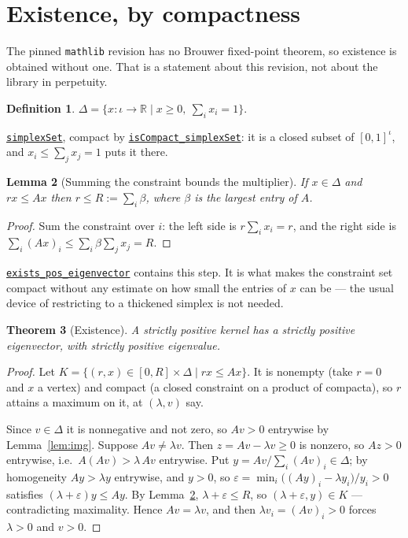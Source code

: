 \documentclass[11pt]{article}
\newtheorem{theorem}{Theorem}[section]
\newtheorem{lemma}[theorem]{Lemma}
\theoremstyle{definition}
\newtheorem{definition}[theorem]{Definition}
\newcommand{\anchor}{08a9050201287a31d20fc4339cc5c6c64b1391fb}
\newcommand{\osline}[3]{%
  \href{https://github.com/lluiseriksson/THE-ERIKSSON-PROGRAMME/blob/\anchor/YangMills/OS/#1.lean\#L#2}{\nolinkurl{#3}}}
\newcommand{\R}{\mathbb{R}}
\begin{document}
\section{Existence, by compactness}

The pinned \texttt{mathlib} revision has no Brouwer fixed-point theorem, so
existence is obtained without one.  That is a statement about this revision, not
about the library in perpetuity.

\begin{definition}
$\Delta=\{x:\iota\to\R\mid x\ge0,\ \sum_i x_i=1\}$.
\end{definition}

\osline{PerronKernel}{176}{simplexSet}, compact by
\osline{PerronKernel}{184}{isCompact\_simplexSet}: it is a closed subset
of $[0,1]^{\iota}$, and $x_i\le\sum_j x_j=1$ puts it there.

\begin{lemma}[Summing the constraint bounds the multiplier]\label{lem:bound}
If $x\in\Delta$ and $rx\le Ax$ then $r\le R:=\sum_{i}\beta$, where $\beta$ is the
largest entry of $A$.
\end{lemma}

\begin{proof}
Sum the constraint over $i$: the left side is $r\sum_i x_i=r$, and the right side
is $\sum_i(Ax)_i\le\sum_i\beta\sum_j x_j=R$.
\end{proof}

\osline{PerronKernel}{201}{exists\_pos\_eigenvector} contains this step.  It
is what makes the constraint set compact without any estimate on how small the
entries of $x$ can be --- the usual device of restricting to a thickened simplex
is not needed.

\begin{theorem}[Existence]\label{thm:exist}
A strictly positive kernel has a strictly positive eigenvector, with strictly
positive eigenvalue.
\end{theorem}

\begin{proof}
Let $K=\{(r,x)\in[0,R]\times\Delta\mid rx\le Ax\}$.  It is nonempty (take $r=0$
and $x$ a vertex) and compact (a closed constraint on a product of compacta), so
$r$ attains a maximum on it, at $(\lambda,v)$ say.

Since $v\in\Delta$ it is nonnegative and not zero, so $Av>0$ entrywise by
Lemma~\ref{lem:img}.  Suppose $Av\neq\lambda v$.  Then $z=Av-\lambda v\ge0$ is
nonzero, so $Az>0$ entrywise, i.e.\ $A(Av)>\lambda\,Av$ entrywise.  Put
$y=Av/\sum_i(Av)_i\in\Delta$; by homogeneity $Ay>\lambda y$ entrywise, and $y>0$,
so
$\varepsilon=\min_i\bigl((Ay)_i-\lambda y_i\bigr)/y_i>0$
satisfies $(\lambda+\varepsilon)y\le Ay$.  By Lemma~\ref{lem:bound},
$\lambda+\varepsilon\le R$, so $(\lambda+\varepsilon,y)\in K$ --- contradicting
maximality.  Hence $Av=\lambda v$, and then $\lambda v_i=(Av)_i>0$ forces
$\lambda>0$ and $v>0$.
\end{proof}
\end{document}
